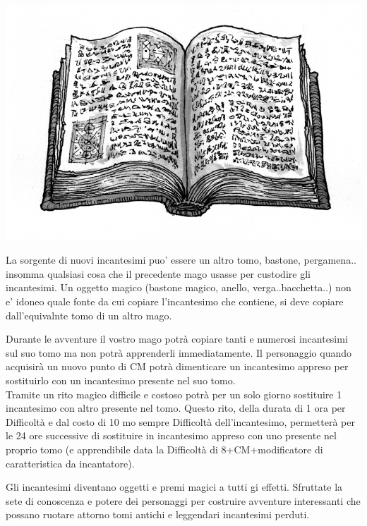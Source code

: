 \begin{multicols}{2}
\begin{center}
	\includegraphics[width=0.9\linewidth]{immagini/spellbook.jpg}
\end{center}

La sorgente di nuovi incantesimi puo' essere un altro tomo, bastone, pergamena.. insomma qualsiasi cosa che il precedente mago usasse per custodire gli incantesimi. Un oggetto magico (bastone magico, anello, verga..bacchetta..) non e' idoneo quale fonte da cui copiare l'incantesimo che contiene, si deve copiare dall'equivalnte tomo di un altro mago.

Durante le avventure il vostro mago potrà copiare tanti e numerosi incantesimi sul suo tomo ma non potrà apprenderli immediatamente. Il personaggio quando acquisirà un nuovo punto di CM potrà dimenticare un incantesimo appreso per sostituirlo con un incantesimo presente nel suo tomo.\\
Tramite un rito magico difficile e costoso potrà per un solo giorno sostituire 1 incantesimo con altro presente nel tomo. Questo rito, della durata di 1 ora per Difficoltà e dal costo di 10 mo sempre Difficoltà dell'incantesimo, permetterà per le 24 ore successive di sostituire in incantesimo appreso con uno presente nel proprio tomo (e apprendibile data la Difficoltà di 8+CM+modificatore di caratteristica da incantatore).

\medskip

\begin{tcolorbox}[title = Incantesimi e Tesori] 
Gli incantesimi diventano oggetti e premi magici a tutti gi effetti. Sfruttate la sete di conoscenza e potere dei personaggi per costruire avventure interessanti che possano ruotare attorno tomi antichi e leggendari incantesimi perduti.
\end{tcolorbox}


\end{multicols}
